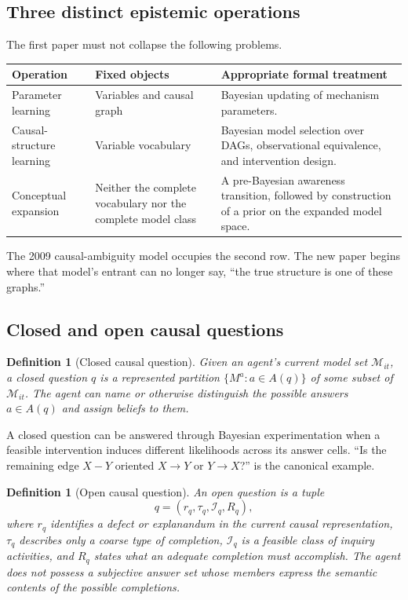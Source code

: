 \documentclass[11pt]{article}
\newtheorem{definition}[proposition]{Definition}
\newcommand{\M}{\mathcal{M}}
\begin{document}
	\subsection{Three distinct epistemic operations}
	
	The first paper must not collapse the following problems.
	
	\begin{center}
		\small
		\begin{tabularx}{\textwidth}{@{}p{}p{}X@{}}
			\toprule
			\textbf{Operation} & \textbf{Fixed objects} & \textbf{Appropriate formal treatment} \\
			\midrule
			Parameter learning & Variables and causal graph & Bayesian updating of mechanism parameters. \\
			Causal-structure learning & Variable vocabulary & Bayesian model selection over DAGs, observational equivalence, and intervention design. \\
			Conceptual expansion & Neither the complete vocabulary nor the complete model class & A pre-Bayesian awareness transition, followed by construction of a prior on the expanded model space. \\
			\bottomrule
		\end{tabularx}
	\end{center}
	
	The 2009 causal-ambiguity model occupies the second row.  The new paper begins where that model's entrant can no longer say, ``the true structure is one of these graphs.''
	
	\subsection{Closed and open causal questions}
	
	\begin{definition}[Closed causal question]
		Given an agent's current model set $\M_{it}$, a closed question $q$ is a represented partition $\{M^a:a\in A(q)\}$ of some subset of $\M_{it}$.  The agent can name or otherwise distinguish the possible answers $a\in A(q)$ and assign beliefs to them.
	\end{definition}
	
	A closed question can be answered through Bayesian experimentation when a feasible intervention induces different likelihoods across its answer cells.  ``Is the remaining edge $X-Y$ oriented $X\to Y$ or $Y\to X$?'' is the canonical example.
	
	\begin{definition}[Open causal question]
		An open question is a tuple
		\begin{equation}
			q=(r_q,\tau_q,\mathcal I_q,R_q),
		\end{equation}
		where $r_q$ identifies a defect or explanandum in the current causal representation, $\tau_q$ describes only a coarse type of completion, $\mathcal I_q$ is a feasible class of inquiry activities, and $R_q$ states what an adequate completion must accomplish.  The agent does not possess a subjective answer set whose members express the semantic contents of the possible completions.
	\end{definition}
	
\end{document}
